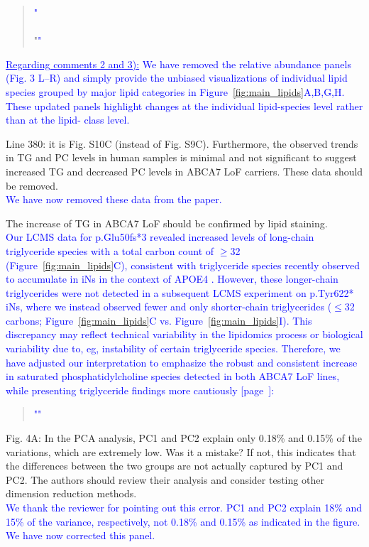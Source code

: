 \begin{quote}
	\textcolor{blue}{"}\quoteA\\\\
	\quoteB"\textcolor{blue}{"}
\end{quote}  
\textcolor{blue}{\underline{Regarding comments 2 and 3):} We have removed the relative abundance panels (Fig. 3 L–R) and simply provide the unbiased visualizations of individual lipid species grouped by major lipid categories in Figure~\ref{fig:main_lipids}A,B,G,H. These updated panels highlight changes at the individual lipid-species level rather than at the lipid- class level.}

Line 380: it is Fig. S10C (instead of Fig. S9C). Furthermore, the observed trends in TG and PC levels in human samples is minimal and not significant to suggest increased TG and decreased PC levels in ABCA7 LoF carriers. These data should be removed.\\
 \textcolor{blue}{We have now removed these data from the paper.}

The increase of TG in ABCA7 LoF should be confirmed by lipid staining.\\
\textcolor{blue}{Our LCMS data for p.Glu50fs*3 revealed increased levels of long-chain triglyceride species with a total carbon count of $\geq$32 (Figure~\ref{fig:main_lipids}C), consistent with triglyceride species recently observed to accumulate in iNs in the context of APOE4 \cite{Haney2024-bp}. However, these longer-chain triglycerides were not detected in a subsequent LCMS experiment on p.Tyr622* iNs, where we instead observed fewer and only shorter-chain triglycerides ($\leq$32 carbons; Figure~\ref{fig:main_lipids}C vs. Figure~\ref{fig:main_lipids}I). This discrepancy may reflect technical variability in the lipidomics process or biological variability due to, eg, instability of certain triglyceride species. Therefore, we have adjusted our interpretation to emphasize the robust and consistent increase in saturated phosphatidylcholine species detected in both ABCA7 LoF lines, while presenting triglyceride findings more cautiously [page~\pageref{quoteH-label}]:}
\begin{quote}
	\textcolor{blue}{"\quoteH"}
\end{quote}

Fig. 4A: In the PCA analysis, PC1 and PC2 explain only 0.18\% and 0.15\% of the variations, which are extremely low. Was it a mistake? If not, this indicates that the differences between the two groups are not actually captured by PC1 and PC2. The authors should review their analysis and consider testing other dimension reduction methods.\\
\textcolor{blue}{We thank the reviewer for pointing out this error. PC1 and PC2 explain 18\% and 15\% of the variance, respectively, not 0.18\% and 0.15\% as indicated in the figure. We have now corrected this panel.}

